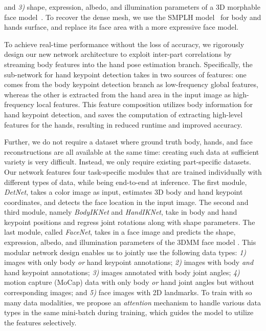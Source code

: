 \documentclass[final]{cvpr}
\begin{document}
and
\textit{3)} shape, expression, albedo, and illumination parameters of a 3D morphable face model~\cite{tewari2017mofa,egger20203d}.
To recover the dense mesh, we use the SMPLH model~\cite{romero2017embodied} for body and hands surface, and replace its face area with a more expressive face model.
\par
To achieve real-time performance without the loss of accuracy, we rigorously design our new network architecture to exploit inter-part correlations by streaming body features into the hand pose estimation branch.
Specifically, the sub-network for hand keypoint detection takes in two sources of features: one comes from the body keypoint detection branch as low-frequency global features, whereas the other is extracted from the hand area in the input image as high-frequency local features.
This feature composition utilizes body information for hand keypoint detection, and saves the computation of extracting high-level features for the hands, resulting in reduced runtime and improved accuracy.
\par
Further, we do not require a dataset where ground truth body, hands, and face reconstructions are all available at the same time: creating such data at sufficient variety is very difficult.
Instead, we only require existing part-specific datasets.
Our network features four task-specific modules that are trained individually with different types of data, while being end-to-end at inference.
The first module, \textit{DetNet}, takes a color image as input, estimates 3D body and hand keypoint coordinates, and detects the face location in the input image.
The second and third module, namely \textit{BodyIKNet} and \textit{HandIKNet}, take in body and hand keypoint positions and regress joint rotations along with shape parameters.
The last module, called \textit{FaceNet}, takes in a face image and predicts the shape, expression, albedo, and illumination parameters of the 3DMM face model \cite{tewari2017mofa}.
This modular network design enables us to jointly use the following data types:
\textit{1)} images with only body \textit{or} hand keypoint annotations;
\textit{2)} images with body \textit{and} hand keypoint annotations;
\textit{3)} images annotated with body joint angles;
\textit{4)} motion capture (MoCap) data with only body \textit{or} hand joint angles but without corresponding images;
and
\textit{5)} face images with 2D landmarks.
To train with so many data modalities, we propose an \textit{attention} mechanism to handle various data types in the same mini-batch during training, which guides the model to utilize the features selectively.
\end{document}
